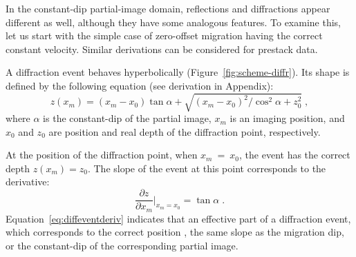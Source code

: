 
In the constant-dip partial-image domain, reflections and diffractions appear different as well, although they
have some analogous features. To examine this, let us start with the simple case of zero-offset migration
having the correct constant velocity. Similar derivations can be considered for prestack data.

A diffraction event behaves hyperbolically (Figure~\ref{fig:scheme-diffr}). Its shape is defined by
the following equation (see derivation in Appendix):
\begin{equation}
\label{eq:diffevent}
z(x_m)=(x_m - x_0) \tan \alpha + \sqrt {(x_m - x_0)^2 / \cos^2 \alpha + z^2_0}\;,
\end{equation}
where $\alpha$ is the constant-dip of the partial image, $x_m$ is an imaging position, and $x_0$ and $z_0$ are position and real depth 
of the diffraction point, respectively.

At the position of the diffraction point, when $x_m~=~x_0$, the event has the correct depth $z(x_m)=z_0$.
The slope of the event at this point corresponds to the derivative:
\begin{equation}
\label{eq:diffeventderiv}
\frac {\partial z }{\partial x_m} \vert_{x_m=x_0} = \tan \alpha\;.
\end{equation}
Equation~\ref{eq:diffeventderiv} indicates that an effective part of a diffraction event, which corresponds to the
correct position ,  the same slope as the migration dip, or the constant-dip of the corresponding partial image.

